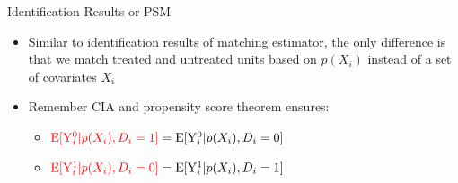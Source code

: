 \documentclass[hyperref={pdfpagelabels=false}]{beamer}
\begin{document}
\begin{frame}{Identification Results or PSM}
	\begin{itemize}	
		
		\item Similar to identification results of matching estimator, the only difference is that we match treated and untreated units based on $p(X_{i})$ instead of a set of covariates $X_{i}$
			\vspace{0.2cm}
		\item Remember CIA and propensity score theorem ensures:
					\vspace{0.2cm}
			\begin{itemize}	
			\item  $\textcolor{red}{\mathrm{E}[\mathrm{Y}^{0}_{i}|p(X_{i}),D_i=1]} = \mathrm{E}[\mathrm{Y}^{0}_{i}|p(X_{i}),D_i=0]$
			\vspace{0.2cm}
			\item  $\textcolor{red}{\mathrm{E}[\mathrm{Y}^{1}_{i}|p(X_{i}),D_i=0]} = \mathrm{E}[\mathrm{Y}^{1}_{i}|p(X_{i}),D_i=1]$
		\end{itemize}
		
	\end{itemize}
	
	
	
	
	
 \end{frame}
\end{document}
